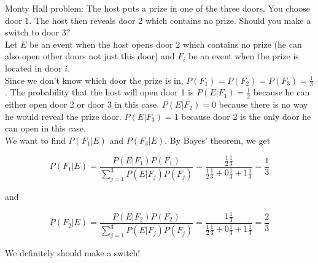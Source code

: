 \begin{texample}
	Monty Hall problem: The host puts a prize in one of the three doors. You choose door 1. The host then reveals door 2 which contains no prize. Should you make a switch to door 3? \\
	
	Let $E$ be an event when the host opens door 2 which contains no prize (he can also open other doors not just this door) and $F_i$ be an event when the prize is located in door $i$. \\
	
	Since we don't know which door the prize is in, $P(F_1)=P(F_2)=P(F_3)=\frac13$. The probability that the host will open door 1 is $P(E|F_1)=\frac12$ because he can either open door 2 or door 3 in this case. $P(E|F_2)=0$ because there is no way he would reveal the prize door. $P(E|F_3)=1$ because door 2 is the only door he can open in this case. \\
	
	We want to find $P(F_1|E)$ and $P(F_3|E)$. By Bayes' theorem, we get
	
	$$P(F_1|E)=\frac{P(E|F_1)P(F_1)}{\sum_{j=1}^3 P(E|F_j)P(F_j)}=\frac{\frac12\frac13}{\frac12\frac13+0\frac13+1\frac13}=\frac13$$
	
	and
	
	$$P(F_2|E)=\frac{P(E|F_2)P(F_2)}{\sum_{j=1}^3 P(E|F_j)P(F_j)}=\frac{1\frac13}{\frac12\frac13+0\frac13+1\frac13}=\frac23$$
	
	We definitely should make a switch!
\end{texample}
